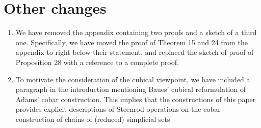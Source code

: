 \documentclass{article}
\begin{document}
	\section{Other changes}
	\begin{enumerate}
		\item We have removed the appendix containing two proofs and a sketch of a third one.
		Specifically, we have moved the proof of Theorem 15 and 24 from the appendix to right below their statement, and replaced the sketch of proof of Proposition 28 with a reference to a complete proof.
		\item To motivate the consideration of the cubical viewpoint, we have included a paragraph in the introduction mentioning Baues' cubical reformulation of Adams' cobar construction.
		This implies that the constructions of this paper provides explicit descriptions of Steenrod operations on the cobar construction of chains of (reduced) simplicial sets
	\end{enumerate}
\end{document}
